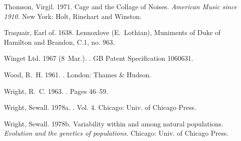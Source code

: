 \begin{thebibliography}{}
Thomson, Virgil. 1971.
\newblock Cage and the Collage of Noises.
 {\em American Music since 1910}.
\newblock New York: Holt, Rinehart and Winston.

Traquair, {Earl of}. 1638.
\newblock Lennoxlove (E.~Lothian), Muniments of Duke of Hamilton and Brandon,
  C.1, no. 963.

{Winget Ltd.} 1967 (8~Mar.).
.
\newblock GB Patent Specification 1060631.

Wood, R.~H. 1961.
.
\newblock London: Thames \& Hudson.

Wright, R.~C. 1963.
.
\newblock Pages  46--59.

Wright, Sewall. 1978a.
.
\newblock  Vol. 4.
\newblock Chicago: Univ. of Chicago Press.

Wright, Sewall. 1978b.
\newblock Variability within and among natural populations.
 {\em Evolution and the genetics of populations}.
\newblock Chicago: Univ. of Chicago Press.

\end{thebibliography}

